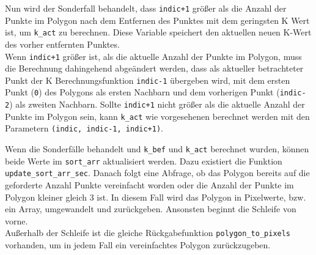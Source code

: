 {	Nun wird der Sonderfall behandelt, dass \lstinline|indic+1| größer als die Anzahl der Punkte im Polygon nach dem Entfernen des Punktes mit dem geringsten K Wert ist, um \lstinline|k_act| zu berechnen. Diese Variable speichert den aktuellen neuen K-Wert des vorher entfernten Punktes. \\
	Wenn \lstinline|indic+1| größer ist, als die aktuelle Anzahl der Punkte im Polygon, muss die Berechnung dahingehend abgeändert werden, dass als aktueller betrachteter Punkt der K Berechnungsfunktion \lstinline|indic-1| übergeben wird, mit dem ersten Punkt (\lstinline|0|) des Polygons als ersten Nachbarn und dem vorherigen Punkt (\lstinline|indic-2|) als zweiten Nachbarn. Sollte \lstinline|indic+1| nicht größer als die aktuelle Anzahl der Punkte im Polygon sein, kann \lstinline|k_act| wie vorgesehenen berechnet werden mit den Parametern \lstinline|(indic, indic-1, indic+1)|.
	\ifimportant
	
	\fi
	Wenn die Sonderfälle behandelt und \lstinline|k_bef| und \lstinline|k_act| berechnet wurden, können beide Werte im \lstinline|sort_arr| aktualisiert werden. Dazu existiert die Funktion \lstinline|update_sort_arr_sec|. Danach folgt eine Abfrage, ob das Polygon bereits auf die geforderte Anzahl Punkte vereinfacht worden oder die Anzahl der Punkte im Polygon kleiner gleich 3 ist. In diesem Fall wird das Polygon in Pixelwerte, bzw. ein Array, umgewandelt und zurückgeben. Ansonsten beginnt die Schleife von vorne. \\
	Außerhalb der Schleife ist die gleiche Rückgabefunktion \lstinline|polygon_to_pixels| vorhanden, um in jedem Fall ein vereinfachtes Polygon zurückzugeben.
	\ifimportant
	
	
	
	\fi

}
